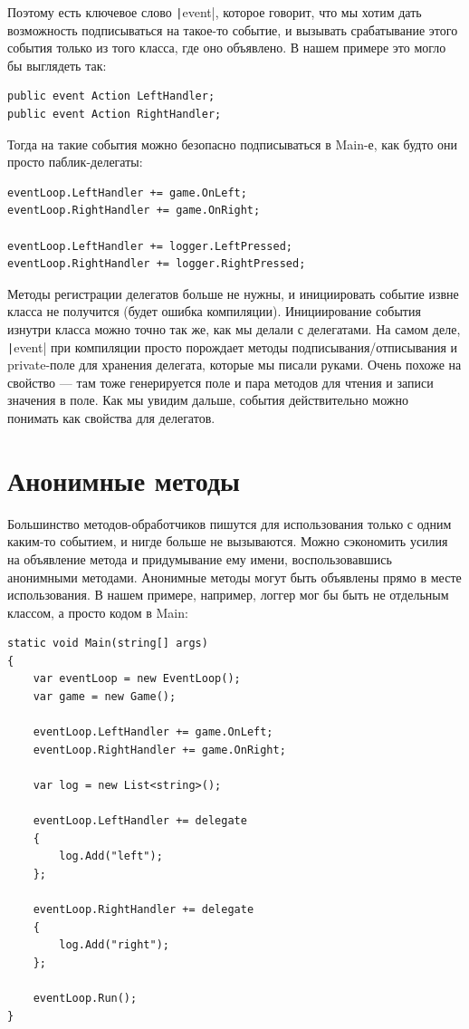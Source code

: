 \documentclass[a5paper]{article}
\begin{document}
Поэтому есть ключевое слово \texttt|event|, которое говорит, что мы хотим дать возможность подписываться на такое-то событие, и вызывать срабатывание этого события только из того класса, где оно объявлено. В нашем примере это могло бы выглядеть так:

\begin{verbatim}
public event Action LeftHandler;
public event Action RightHandler;
\end{verbatim}

Тогда на такие события можно безопасно подписываться в Main-е, как будто они просто паблик-делегаты:

\begin{verbatim}
eventLoop.LeftHandler += game.OnLeft;
eventLoop.RightHandler += game.OnRight;

eventLoop.LeftHandler += logger.LeftPressed;
eventLoop.RightHandler += logger.RightPressed;
\end{verbatim}

Методы регистрации делегатов больше не нужны, и инициировать событие извне класса не получится (будет ошибка компиляции). Инициирование события изнутри класса можно точно так же, как мы делали с делегатами. На самом деле, \texttt|event| при компиляции просто порождает методы подписывания/отписывания и private-поле для хранения делегата, которые мы писали руками. Очень похоже на свойство --- там тоже генерируется поле и пара методов для чтения и записи значения в поле. Как мы увидим дальше, события действительно можно понимать как свойства для делегатов.

\section{Анонимные методы}

Большинство методов-обработчиков пишутся для использования только с одним каким-то событием, и нигде больше не вызываются. Можно сэкономить усилия на объявление метода и придумывание ему имени, воспользовавшись анонимными методами. Анонимные методы могут быть объявлены прямо в месте использования. В нашем примере, например, логгер мог бы быть не отдельным классом, а просто кодом в Main:

\begin{verbatim}
static void Main(string[] args)
{
    var eventLoop = new EventLoop();
    var game = new Game();

    eventLoop.LeftHandler += game.OnLeft;
    eventLoop.RightHandler += game.OnRight;

    var log = new List<string>();

    eventLoop.LeftHandler += delegate 
    {
        log.Add("left");
    };

    eventLoop.RightHandler += delegate
    {
        log.Add("right");
    };

    eventLoop.Run();
}
\end{verbatim}
\end{document}
